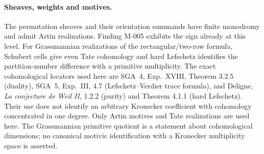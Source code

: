 \paragraph{Sheaves, weights and motives.}
The permutation sheaves and their orientation summands have
finite monodromy and admit Artin realizations.  Finding M-005
exhibits the sign already at this level.  For Grassmannian
realizations of the rectangular/two-row formula, Schubert cells
give even Tate cohomology and hard Lefschetz identifies the
partition-number difference with a primitive multiplicity.
The exact cohomological locators used here are SGA~4,
Exp.~XVIII, Theorem 3.2.5 (duality), SGA~5, Exp.~III, 4.7
(Lefschetz--Verdier trace formula), and Deligne,
\emph{La conjecture de Weil II}, 1.2.2 (purity) and
Theorem 4.1.1 (hard Lefschetz).
Their use does not identify an arbitrary Kronecker coefficient
with cohomology concentrated in one degree.
Only Artin motives and Tate realizations are used here. The
Grassmannian primitive quotient is a statement about cohomological
dimensions; no canonical motivic identification with a Kronecker
multiplicity space is asserted.
